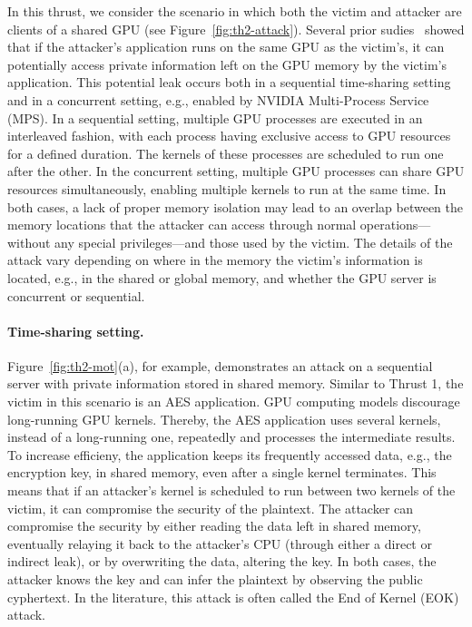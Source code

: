 In this thrust, we consider the scenario in which both the victim and attacker are clients of a shared GPU (see Figure~\ref{fig:th2-attack}). 
%
Several prior sudies~\cite{lee} showed that if the attacker's application runs on the same GPU as the victim's, it can potentially access private information left on the GPU memory by the victim's application.
%
This potential leak occurs both in a sequential time-sharing setting and in a concurrent setting, e.g., enabled by NVIDIA Multi-Process Service (MPS).
%
In a sequential setting, multiple GPU processes are executed in an interleaved fashion, with each process having exclusive access to GPU resources for a defined duration. The kernels of these processes are scheduled to run one after the other.
%
In the concurrent setting, multiple GPU processes can share GPU resources simultaneously, enabling multiple kernels to run at the same time.
%
In both cases, a lack of proper memory isolation may lead to an overlap between the memory locations that the attacker can access through normal operations—without any special privileges—and those used by the victim.
%
%
%
%
%
The details of the attack vary depending on where in the memory the victim's information is located, e.g., in the shared or global memory, and whether the GPU server is concurrent or sequential.
%

\paragraph{Time-sharing setting.}

Figure~\ref{fig:th2-mot}(a), for example, demonstrates an attack on a sequential server with private information stored in shared memory.
%
Similar to Thrust 1, the victim in this scenario is an AES application.
% 
GPU computing models discourage long-running GPU kernels. 
%
Thereby, the AES application uses several kernels, instead of a long-running one, repeatedly and processes the intermediate results. 
%
To increase efficieny, the application keeps its frequently accessed data, e.g., the encryption key, in shared memory, even after a single kernel terminates.
%
This means that if an attacker's kernel is scheduled to run between two kernels of the victim, it can compromise the security of the plaintext. 
%
The attacker can compromise the security by either reading the data left in shared memory, eventually relaying it back to the attacker's CPU (through either a direct or indirect leak), or by overwriting the data, altering the key.
%
In both cases, the attacker knows the key and can infer the plaintext by observing the public cyphertext. 
%
In the literature, this attack is often called the End of Kernel (EOK) attack.


